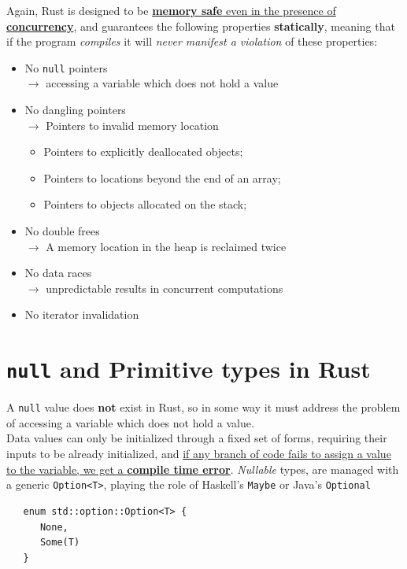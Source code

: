 Again, Rust is designed to be \ul{\textbf{memory safe} even in the presence
of \textbf{concurrency}}, and guarantees the following properties \textbf{statically}, meaning that
if the program \textit{compiles} it will \textit{never manifest a violation} of these properties: 
\begin{itemize}
   \item No \texttt{null} pointers\\
   $\longrightarrow$ accessing a variable which does not hold a value
   \item No dangling pointers\\
   $\longrightarrow$ Pointers to invalid memory location
   \begin{itemize}
      \item Pointers to explicitly deallocated objects;
      \item Pointers to locations beyond the end of an array;
      \item Pointers to objects allocated on the stack;
   \end{itemize}
   \item No double frees\\
   $\longrightarrow$ A memory location in the heap is reclaimed twice
   \item No data races\\
   $\longrightarrow$ unpredictable results in concurrent computations
   \item No iterator invalidation
\end{itemize}

\section{\texttt{null} and Primitive types in Rust}
A \texttt{null} value does \textbf{not} exist in Rust, so in some way it must address the problem of accessing a variable which does not hold a value.\\
Data values can only be initialized through a fixed set of
forms, requiring their inputs to be already initialized, and \ul{if 
any branch of code fails to assign a
value to the variable, we get a \textbf{compile time error}}.
\lstset{language=Rust}
\textit{Nullable} types, are managed with a generic \lstinline|Option<T>|, playing
the role of Haskell's \texttt{Maybe} or Java's \texttt{Optional}
\begin{lstlisting}
   enum std::option::Option<T> {
      None,
      Some(T)
   }
\end{lstlisting}

